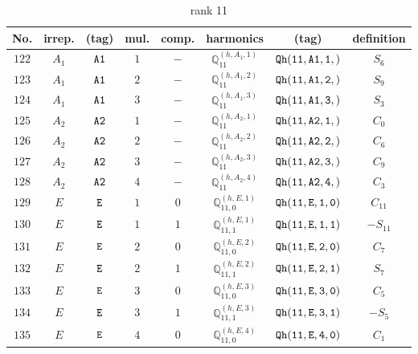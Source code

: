 \documentclass[fleqn,8pt]{jsarticle}
\begin{document}
\begin{table}[ht!]
\begin{center}
\caption{rank 11}
\renewcommand{\arraystretch}{1.3}
\begin{tabular}{cccccccc} \hline \hline
No. & irrep. & (tag) & mul. & comp. & harmonics & (tag) & definition \\ \hline
$ 122 $ & $ A_{1} $ & $ {\tt A1} $ & $ 1 $ & $ - $ & $ \mathbb{Q}_{11}^{(h,A_{1},1)} $ & $ {\tt Qh(11,A1,1,)} $ & $ S_{6} $ \\
$ 123 $ & $ A_{1} $ & $ {\tt A1} $ & $ 2 $ & $ - $ & $ \mathbb{Q}_{11}^{(h,A_{1},2)} $ & $ {\tt Qh(11,A1,2,)} $ & $ S_{9} $ \\
$ 124 $ & $ A_{1} $ & $ {\tt A1} $ & $ 3 $ & $ - $ & $ \mathbb{Q}_{11}^{(h,A_{1},3)} $ & $ {\tt Qh(11,A1,3,)} $ & $ S_{3} $ \\
$ 125 $ & $ A_{2} $ & $ {\tt A2} $ & $ 1 $ & $ - $ & $ \mathbb{Q}_{11}^{(h,A_{2},1)} $ & $ {\tt Qh(11,A2,1,)} $ & $ C_{0} $ \\
$ 126 $ & $ A_{2} $ & $ {\tt A2} $ & $ 2 $ & $ - $ & $ \mathbb{Q}_{11}^{(h,A_{2},2)} $ & $ {\tt Qh(11,A2,2,)} $ & $ C_{6} $ \\
$ 127 $ & $ A_{2} $ & $ {\tt A2} $ & $ 3 $ & $ - $ & $ \mathbb{Q}_{11}^{(h,A_{2},3)} $ & $ {\tt Qh(11,A2,3,)} $ & $ C_{9} $ \\
$ 128 $ & $ A_{2} $ & $ {\tt A2} $ & $ 4 $ & $ - $ & $ \mathbb{Q}_{11}^{(h,A_{2},4)} $ & $ {\tt Qh(11,A2,4,)} $ & $ C_{3} $ \\
$ 129 $ & $ E $ & $ {\tt E} $ & $ 1 $ & $ 0 $ & $ \mathbb{Q}_{11,0}^{(h,E,1)} $ & $ {\tt Qh(11,E,1,0)} $ & $ C_{11} $ \\
$ 130 $ & $ E $ & $ {\tt E} $ & $ 1 $ & $ 1 $ & $ \mathbb{Q}_{11,1}^{(h,E,1)} $ & $ {\tt Qh(11,E,1,1)} $ & $ - S_{11} $ \\
$ 131 $ & $ E $ & $ {\tt E} $ & $ 2 $ & $ 0 $ & $ \mathbb{Q}_{11,0}^{(h,E,2)} $ & $ {\tt Qh(11,E,2,0)} $ & $ C_{7} $ \\
$ 132 $ & $ E $ & $ {\tt E} $ & $ 2 $ & $ 1 $ & $ \mathbb{Q}_{11,1}^{(h,E,2)} $ & $ {\tt Qh(11,E,2,1)} $ & $ S_{7} $ \\
$ 133 $ & $ E $ & $ {\tt E} $ & $ 3 $ & $ 0 $ & $ \mathbb{Q}_{11,0}^{(h,E,3)} $ & $ {\tt Qh(11,E,3,0)} $ & $ C_{5} $ \\
$ 134 $ & $ E $ & $ {\tt E} $ & $ 3 $ & $ 1 $ & $ \mathbb{Q}_{11,1}^{(h,E,3)} $ & $ {\tt Qh(11,E,3,1)} $ & $ - S_{5} $ \\
$ 135 $ & $ E $ & $ {\tt E} $ & $ 4 $ & $ 0 $ & $ \mathbb{Q}_{11,0}^{(h,E,4)} $ & $ {\tt Qh(11,E,4,0)} $ & $ C_{1} $ \\

\end{tabular}
\end{center}
\end{table}
\end{document}
